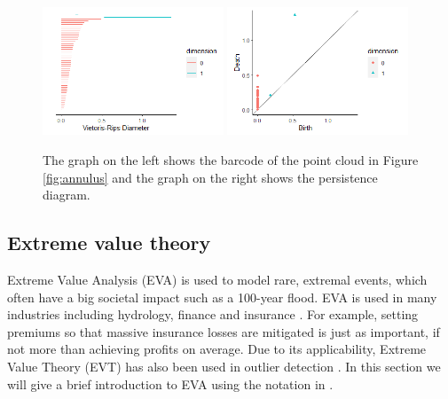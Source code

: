 \documentclass[11pt,a4paper,]{article}
\theoremstyle{definition}
\theoremstyle{definition}
\theoremstyle{definition}
\theoremstyle{remark}
\begin{document}
\begin{figure}[!ht]
    \centering
            \includegraphics[width=0.48\textwidth]{../Graphics/barcode.png}
        \label{fig:barcodeandpersistence1}
            \includegraphics[width=0.48\textwidth]{../Graphics/persistence.png}
        \label{fig:barcodeandpersistence2}
        
    \caption{ The graph on the left shows the barcode of the point cloud in Figure \ref{fig:annulus} and the graph on the right shows the persistence diagram. }
  \label{fig:barcodeandpersistence} 
\end{figure}

\hypertarget{extreme-value-theory}{%
\subsection{\texorpdfstring{Extreme value theory \label{subsec:evt}}{Extreme value theory }}\label{extreme-value-theory}}

Extreme Value Analysis (EVA) is used to model rare, extremal events, which often have a big societal impact such as a 100-year flood. EVA is used in many industries including hydrology, finance and insurance \autocite{Reiss2001}. For example, setting premiums so that massive insurance losses are mitigated is just as important, if not more than achieving profits on average. Due to its applicability, Extreme Value Theory (EVT) has also been used in outlier detection \autocite{wilkinson2017visualizing,talagala2019anomaly}. In this section we will give a brief introduction to EVA using the notation in \textcite{coles2001introduction}.
\end{document}

